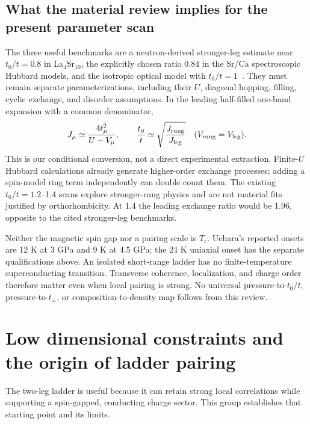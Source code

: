\documentclass[11pt]{article}
\begin{document}
\subsection*{What the material review implies for the present parameter scan}
The three useful benchmarks are a neutron-derived stronger-leg estimate near
$t_0/t=0.8$ in La$_4$Sr$_{10}$, the explicitly chosen ratio 0.84 in the
Sr/Ca spectroscopic Hubbard models, and the isotropic optical model with
$t_0/t=1$~\citep{Notbohm2007,Padma2025,Scheie2025,Popovic2000}.
They must remain separate parameterizations, including their $U$, diagonal
hopping, filling, cyclic exchange, and disorder assumptions. In the leading
half-filled one-band expansion with a common denominator,
\begin{equation}
 J_\mu\simeq\frac{4t_\mu^2}{U-V_\mu},\qquad
 \frac{t_0}{t}\simeq\sqrt{\frac{J_{\rm rung}}{J_{\rm leg}}}
 \quad(V_{\rm rung}=V_{\rm leg}).
\end{equation}
This is our conditional conversion, not a direct experimental extraction.
Finite-$U$ Hubbard calculations already generate higher-order exchange
processes; adding a spin-model ring term independently can double count them.
The existing $t_0/t=1.2$--1.4 scans explore stronger-rung physics and are not
material fits justified by orthorhombicity. At 1.4 the leading exchange ratio
would be 1.96, opposite to the cited stronger-leg benchmarks.

Neither the magnetic spin gap nor a pairing scale is $T_c$. Uehara's reported
onsets are 12 K at 3 GPa and 9 K at 4.5 GPa; the 24 K uniaxial onset has the
separate qualifications above. An isolated short-range ladder has no
finite-temperature superconducting transition. Transverse coherence,
localization, and charge order therefore matter even when local pairing is
strong. No universal pressure-to-$t_0/t$, pressure-to-$t_\perp$, or
composition-to-density map follows from this review.

\section{Low dimensional constraints and the origin of ladder pairing}
The two-leg ladder is useful because it can retain strong local correlations while supporting a spin-gapped, conducting charge sector. This group establishes that starting point and its limits.
\end{document}
